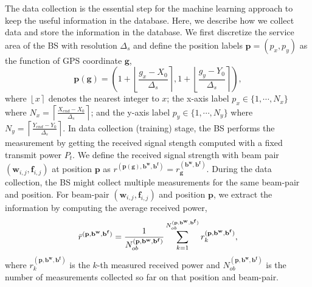 \documentclass[12pt, draftcls, onecolumn]{IEEEtran}
\theoremstyle{plain}
\theoremstyle{definition}
\theoremstyle{remark}
\newcommand{\nt}[1]{\textcolor{red}{\textbf{[#1]}}}
\newcommand{\round}[1]{\ensuremath{\left\lfloor#1\right\rceil}}
\begin{document}
The data collection is the essential step for the machine learning approach to keep the useful information in the database.
Here, we describe how we collect data and store the information in the database.
We first discretize the service area of the BS with resolution $\Delta_s$ and define the position labels $\mathbf p = (p_x,p_y)$ as the function of GPS coordinate $\mathbf g$,
\begin{equation}
\label{pos_label_derive}
\mathbf{p}(\mathbf{g})=\left(1 + \round{\frac{g_x-X_0}{\Delta_s}},1 + \round{\frac{g_y-Y_0}{\Delta_s}}\right),
\end{equation}
where $\round{x}$ denotes the nearest integer to $x$; the x-axis label $p_x\in \{1,\cdots,N_x\}$ where $N_x = \left\lceil\frac{X_{end}-X_0}{\Delta_s}\right\rceil$; and the y-axis label $p_y\in \{1,\cdots,N_y\}$ where $N_y =\left\lceil \frac{Y_{end}-Y_0}{\Delta_s}\right\rceil$.
In data collection (training) stage, the BS performs the measurement by getting the received signal stength computed with a fixed transmit power $P_t$.
We define the received signal strength with beam pair $(\mathbf{w}_{i,j},\mathbf f_{i,j})$ at position $\mathbf{p}$ as ${r}^{\left(\mathbf{p}(\mathbf g),\mathbf b^{\mathbf w},\mathbf b^{\mathbf f}\right)}={r}^{\left(\mathbf b^{\mathbf w},\mathbf b^{\mathbf f}\right)}_{\mathbf g}$.
During the data collection, the BS might collect multiple measurements for the same beam-pair and position.
For beam-pair $(\mathbf{w}_{i,j},\mathbf{f}_{i,j})$ and position $\mathbf p$, we extract the information by computing the average received power, \begin{equation}
\label{statisticalCSI}
	\Bar{r}^{(\mathbf{p},\mathbf{b}^{\mathbf w},\mathbf{b}^{\mathbf f})} = \frac{1}{N_{ob}^{(\mathbf p,\mathbf{b}^{\mathbf w},\mathbf{b}^{\mathbf f})}}\sum_{k=1}^{N_{ob}^{(\mathbf p,\mathbf{b}^{\mathbf w},\mathbf{b}^{\mathbf f})}}r^{(\mathbf{p},\mathbf{b}^{\mathbf w},\mathbf{b}^{\mathbf f})}_k,
\end{equation} 
where $r^{(\mathbf{p},\mathbf{b}^{\mathbf w},\mathbf{b}^{\mathbf f})}_k$ is the $k$-th measured received power and $N_{ob}^{(\mathbf p,\mathbf{b}^{\mathbf w},\mathbf{b}^{\mathbf f})}$ is the number of measurements collected so far on that position and beam-pair.
\end{document}

